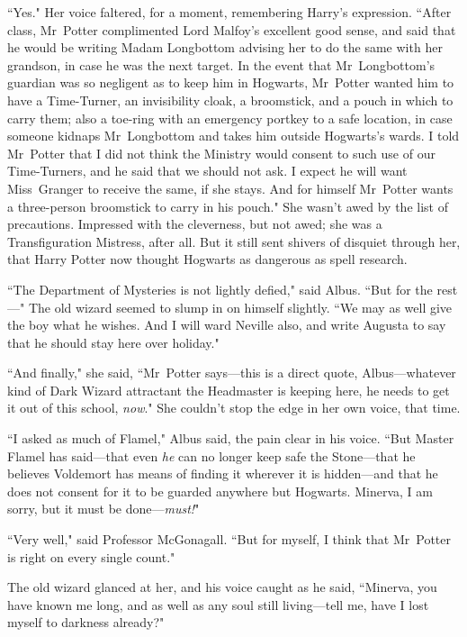 ``Yes." Her voice faltered, for a moment, remembering Harry's expression. ``After class, Mr~Potter complimented Lord Malfoy's excellent good sense, and said that he would be writing Madam Longbottom advising her to do the same with her grandson, in case he was the next target. In the event that Mr~Longbottom's guardian was so negligent as to keep him in Hogwarts, Mr~Potter wanted him to have a Time-Turner, an invisibility cloak, a broomstick, and a pouch in which to carry them; also a toe-ring with an emergency portkey to a safe location, in case someone kidnaps Mr~Longbottom and takes him outside Hogwarts's wards. I told Mr~Potter that I did not think the Ministry would consent to such use of our Time-Turners, and he said that we should not ask. I expect he will want Miss~Granger to receive the same, if she stays. And for himself Mr~Potter wants a three-person broomstick to carry in his pouch." She wasn't awed by the list of precautions. Impressed with the cleverness, but not awed; she was a Transfiguration Mistress, after all. But it still sent shivers of disquiet through her, that Harry Potter now thought Hogwarts as dangerous as spell research.

``The Department of Mysteries is not lightly defied," said Albus. ``But for the rest—" The old wizard seemed to slump in on himself slightly. ``We may as well give the boy what he wishes. And I will ward Neville also, and write Augusta to say that he should stay here over holiday."

``And finally," she said, ``Mr~Potter says—this is a direct quote, Albus—whatever kind of Dark Wizard attractant the Headmaster is keeping here, he needs to get it out of this school, \emph{now}." She couldn't stop the edge in her own voice, that time.

``I asked as much of Flamel," Albus said, the pain clear in his voice. ``But Master Flamel has said—that even \emph{he} can no longer keep safe the Stone—that he believes Voldemort has means of finding it wherever it is hidden—and that he does not consent for it to be guarded anywhere but Hogwarts. Minerva, I am sorry, but it must be done—\emph{must!}"

``Very well," said Professor McGonagall. ``But for myself, I think that Mr~Potter is right on every single count."

The old wizard glanced at her, and his voice caught as he said, ``Minerva, you have known me long, and as well as any soul still living—tell me, have I lost myself to darkness already?"

